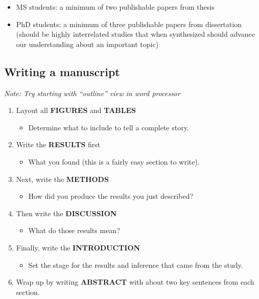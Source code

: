 \documentclass[
]{article}
\providecommand{\tightlist}{%
  \setlength{\itemsep}{0pt}\setlength{\parskip}{0pt}}
\begin{document}
\begin{itemize}
\tightlist
\item
  MS students: a minimum of two publishable papers from thesis
\item
  PhD students: a minimum of three publishable papers from dissertation (should be highly interrelated studies that when synthesized should advance our understanding about an important topic)
\end{itemize}

\hypertarget{writing-a-manuscript}{%
\subsection{Writing a manuscript}\label{writing-a-manuscript}}

\emph{Note: Try starting with ``outline'' view in word processor}

\begin{enumerate}
\def\labelenumi{\arabic{enumi})}
\tightlist
\item
  Layout all \textbf{FIGURES} and \textbf{TABLES}

  \begin{itemize}
  \tightlist
  \item
    Determine what to include to tell a complete story.
  \end{itemize}
\item
  Write the \textbf{RESULTS} first

  \begin{itemize}
  \tightlist
  \item
    What you found (this is a fairly easy section to write).
  \end{itemize}
\item
  Next, write the \textbf{METHODS}

  \begin{itemize}
  \tightlist
  \item
    How did you produce the results you just described?
  \end{itemize}
\item
  Then write the \textbf{DISCUSSION}

  \begin{itemize}
  \tightlist
  \item
    What do those results mean?
  \end{itemize}
\item
  Finally, write the \textbf{INTRODUCTION}

  \begin{itemize}
  \tightlist
  \item
    Set the stage for the results and inference that came from the study.
  \end{itemize}
\item
  Wrap up by writing \textbf{ABSTRACT} with about two key sentences from each section.
\end{enumerate}
\end{document}
